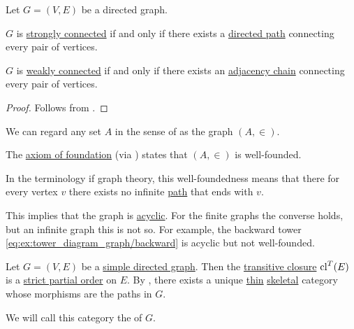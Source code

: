 \begin{proposition}\label{thm:graph_connectedness_via_chains}
  Let \( G = (V, E) \) be a directed graph.

  \begin{thmenum}
     \( G \) is \hyperref[def:graph_connectedness/strong]{strongly connected} if and only if there exists a \hyperref[def:graph_directed_path]{directed path} connecting every pair of vertices.

     \( G \) is \hyperref[def:graph_connectedness/weak]{weakly connected} if and only if there exists an \hyperref[def:graph_adjacency_chain]{adjacency chain} connecting every pair of vertices.
  \end{thmenum}
\end{proposition}
\begin{proof}
  Follows from .
\end{proof}

\begin{remark}\label{rem:well_founded_graphs}
  We can regard any set \( A \) in the sense of \hyperref[def:zfc]{} as the graph \( (A, \in) \).

  The \hyperref[def:zfc/foundation]{axiom of foundation} (via ) states that \( (A, \in) \) is well-founded.

  In the terminology if graph theory, this well-foundedness means that there for every vertex \( v \) there exists no infinite \hyperref[def:graph_directed_path]{path} that ends with \( v \).

  This implies that the graph is \hyperref[def:graph_cycle]{acyclic}. For the finite graphs the converse holds, but an infinite graph this is not so. For example, the backward tower \eqref{eq:ex:tower_diagram_graph/backward} is acyclic but not well-founded.
\end{remark}

\begin{definition}\label{def:graph_path_category}
  Let \( G = (V, E) \) be a \hyperref[def:graph/simple]{simple directed graph}. Then the \hyperref[def:relation_closures/transitive]{transitive closure} \( \operatorname{cl}^T(E) \) is a \hyperref[def:partially_ordered_set/strict]{strict partial order} on \( E \). By , there exists a unique \hyperref[def:thin_category]{thin} \hyperref[def:skeletal_category]{skeletal} category whose morphisms are the paths in \( G \).

  We will call this category the  of \( G \).
\end{definition}

